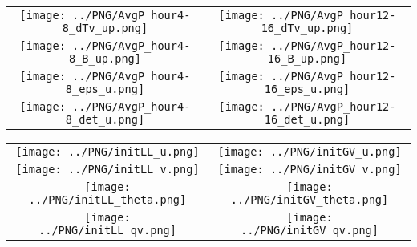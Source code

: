\documentclass{article}
\begin{document}
\newpage

\begin{table}
  \begin{tabular}{cc}
     \texttt{[image: ../PNG/AvgP\_hour4-8\_dTv\_up.png]} & \texttt{[image: ../PNG/AvgP\_hour12-16\_dTv\_up.png]} \\
     \texttt{[image: ../PNG/AvgP\_hour4-8\_B\_up.png]}   & \texttt{[image: ../PNG/AvgP\_hour12-16\_B\_up.png]}   \\
     \texttt{[image: ../PNG/AvgP\_hour4-8\_eps\_u.png]}  & \texttt{[image: ../PNG/AvgP\_hour12-16\_eps\_u.png]}  \\
     \texttt{[image: ../PNG/AvgP\_hour4-8\_det\_u.png]}  & \texttt{[image: ../PNG/AvgP\_hour12-16\_det\_u.png]}
  \end{tabular}
\end{table}

\newpage

\begin{table}
  \begin{tabular}{cc}
     \texttt{[image: ../PNG/initLL\_u.png]}     & \texttt{[image: ../PNG/initGV\_u.png]}     \\
     \texttt{[image: ../PNG/initLL\_v.png]}     & \texttt{[image: ../PNG/initGV\_v.png]}     \\
     \texttt{[image: ../PNG/initLL\_theta.png]} & \texttt{[image: ../PNG/initGV\_theta.png]} \\
     \texttt{[image: ../PNG/initLL\_qv.png]}    & \texttt{[image: ../PNG/initGV\_qv.png]}
  \end{tabular}
\end{table}
\end{document}
